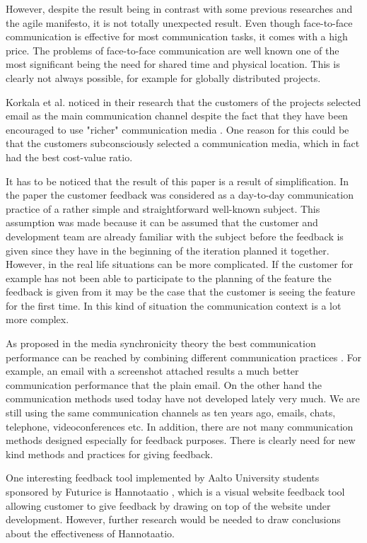 \documentclass[conference]{IEEEtran}
\begin{document}
However, despite the result being in contrast with some previous researches and the agile manifesto, it is not totally unexpected result. Even though face-to-face communication is effective for most communication tasks, it comes with a high price. The problems of face-to-face communication are well known one of the most significant being the need for shared time and physical location. This is clearly not always possible, for example for globally distributed projects.

Korkala et al. noticed in their research that the customers of the projects selected email as the main communication channel despite the fact that they have been encouraged to use "richer" communication media \cite{2006korkala}. One reason for this could be that the customers subconsciously selected a communication media, which in fact had the best cost-value ratio.

It has to be noticed that the result of this paper is a result of simplification. In the paper the customer feedback was considered as a day-to-day communication practice of a rather simple and straightforward well-known subject. This assumption was made because it can be assumed that the customer and development team are already familiar with the subject before the feedback is given since they have in the beginning of the iteration planned it together. However, in the real life situations can be more complicated. If the customer for example has not been able to participate to the planning of the feature the feedback is given from it may be the case that the customer is seeing the feature for the first time. In this kind of situation the communication context is a lot more complex.

As proposed in the media synchronicity theory the best communication performance can be reached by combining different communication practices \cite{2008dennis}. For example, an email with a screenshot attached results a much better communication performance that the plain email. On the other hand the communication methods used today have not developed lately very much. We are still using the same communication channels as ten years ago, emails, chats, telephone, videoconferences etc. In addition, there are not many communication methods designed especially for feedback purposes. There is clearly need for new kind methods and practices for giving feedback.

One interesting feedback tool implemented by Aalto University students sponsored by Futurice is Hannotaatio \cite{hannotaatio}, which is a visual website feedback tool allowing customer to give feedback by drawing on top of the website under development. However, further research would be needed to draw conclusions about the effectiveness of Hannotaatio.
\end{document}
